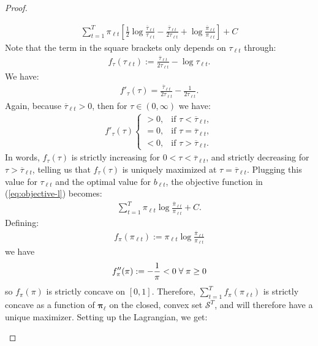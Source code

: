 \begin{proof}
\begin{enumerate}[label=\roman*.]
\begin{align*}
     \sum_{t=1}^T \pi_{\ell t}\left[\frac{1}{2} \log \frac{\overline{\tau}_{\ell t}}{\tau_{\ell t}} - \frac{\overline{\tau}_{\ell t}}{2\tau_{\ell t}} + \log \frac{\overline{\pi}_{\ell t} }{\pi_{\ell t}}\right]+C
\end{align*}
Note that the term in the square brackets only depends on $\tau_{\ell t}$ through:
\begin{align*}
    f_\tau(\tau_{\ell t}) :=  \frac{\overline{\tau}_{\ell t}}{2\tau_{\ell t}} - \log \tau_{\ell t}.
\end{align*}
We have:
\begin{align*}
    f'_\tau(\tau) = \frac{\overline{\tau}_{\ell t}}{2 \tau_{\ell t}} - \frac{1}{2\tau_{\ell t}}.
\end{align*}
Again, because $\overline{\tau}_{\ell t} > 0$, then for $\tau \in (0,\infty)$ we have:
\begin{align*}
    f'_\tau(\tau)
    \begin{cases}
        > 0, & \text{if } \tau < \overline{\tau}_{\ell t}, \\ 
        = 0, & \text{if } \tau = \overline{\tau}_{\ell t}, \\  
        < 0, & \text{if } \tau > \overline{\tau}_{\ell t}.
    \end{cases}
\end{align*}
In words, $f_\tau(\tau)$ is strictly increasing for $0 < \tau < \overline{\tau}_{\ell t}$, and strictly decreasing for $\tau > \overline{\tau}_{\ell t}$, telling us that $f_\tau(\tau)$ is uniquely maximized at $\tau = \overline{\tau}_{\ell t}$. Plugging this value for $\tau_{\ell t}$ and the optimal value for $b_{\ell t}$, the objective function in (\ref{eq:objective-l}) becomes:
\begin{align*}
    \sum_{t=1}^T \pi_{\ell t} \log \frac{\overline{\pi}_{\ell t}}{\pi_{\ell t}} +C.
\end{align*}
Defining:
\begin{align*}
    f_\pi(\pi_{\ell t}):=\pi_{\ell t} \log \frac{\overline{\pi}_{\ell t}}{\pi_{\ell t}}
\end{align*}
we have
\begin{align*}
    f''_\pi(\pi):= -\frac{1}{\pi} < 0 \;\forall\; \pi \geq 0
\end{align*}
so $f_\pi(\pi)$ is strictly concave on $[0,1]$. Therefore, $\sum_{t=1}^T f_\pi(\pi_{\ell t})$ is strictly concave as a function of $\pmb{\pi}_\ell$ on the closed, convex set $\mathcal{S}^T$, and will therefore have a unique maximizer. Setting up the Lagrangian, we get:

\end{enumerate}
\end{proof}
